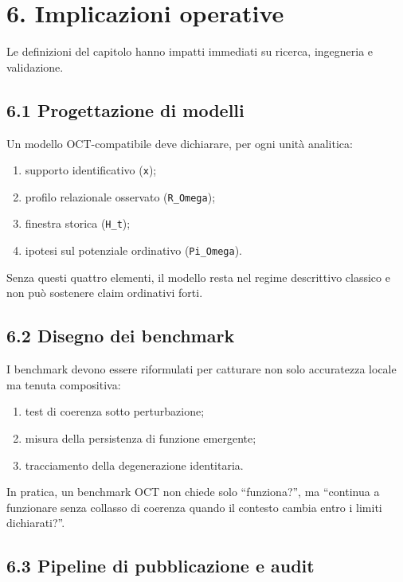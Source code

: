 \section{6. Implicazioni operative}

Le definizioni del capitolo hanno impatti immediati su ricerca, ingegneria e validazione.

\subsection{6.1 Progettazione di modelli}

Un modello OCT-compatibile deve dichiarare, per ogni unità analitica:

\begin{enumerate}
\def\labelenumi{\arabic{enumi}.}
\tightlist
\item
  supporto identificativo (\texttt{x});
\item
  profilo relazionale osservato (\texttt{R\_Omega});
\item
  finestra storica (\texttt{H\_t});
\item
  ipotesi sul potenziale ordinativo (\texttt{Pi\_Omega}).
\end{enumerate}

Senza questi quattro elementi, il modello resta nel regime descrittivo classico e non può sostenere claim ordinativi forti.

\subsection{6.2 Disegno dei benchmark}

I benchmark devono essere riformulati per catturare non solo accuratezza locale ma tenuta compositiva:

\begin{enumerate}
\def\labelenumi{\arabic{enumi}.}
\tightlist
\item
  test di coerenza sotto perturbazione;
\item
  misura della persistenza di funzione emergente;
\item
  tracciamento della degenerazione identitaria.
\end{enumerate}

In pratica, un benchmark OCT non chiede solo ``funziona?'', ma ``continua a funzionare senza collasso di coerenza quando il contesto cambia entro i limiti dichiarati?''.

\subsection{6.3 Pipeline di pubblicazione e audit}

